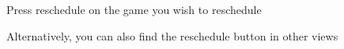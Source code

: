 \documentclass{article}
\begin{document}
\begin{figure}[H]
    \centering
    \caption{Press reschedule on the game you wish to reschedule}
\end{figure}

\begin{figure}[H]
    \centering
    \caption{Alternatively, you can also find the reschedule button in other views}
\end{figure}
\end{document}
